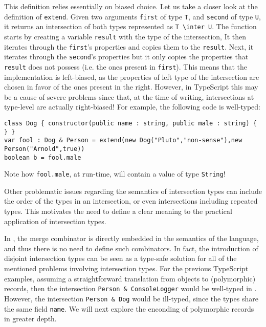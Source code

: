 This definition relies essentially on biased choice.
Let us take a closer look at the definition of \lstinline$extend$.
Given two arguments \lstinline$first$ of type \lstinline$T$, and \lstinline$second$ of type 
\lstinline $U$, it returns an intersection of both types represented as \lstinline$T \inter U$.
The function starts by creating a variable \lstinline$result$ with the type of the intersection, 
It then iterates through the \lstinline$first$'s properties and copies them to the 
\lstinline$result$.
Next, it iterates through the \lstinline$second$'s properties but it only copies the properties
that \lstinline$result$ does not possess (i.e. the ones present in \lstinline$first$).
This means that the implementation is left-biased, as the properties of left type of the intersection
are chosen in favor of the ones present in the right.
However, in TypeScript this may be a cause of severe problems since that, at the time of writing,
intersections at type-level are actually right-biased!
For example, the following code is well-typed:

\begin{lstlisting}
class Dog { constructor(public name : string, public male : string) { } }
var fool : Dog & Person = extend(new Dog("Pluto","non-sense"),new Person("Arnold",true))
boolean b = fool.male
\end{lstlisting}
Note how \lstinline$fool.male$, at run-time, will contain a value of type \lstinline$String$! 

Other problematic issues regarding the semantics of intersection types can include the order of 
the types in an intersection, or even intersections including repeated types.
This motivates the need to define a clear meaning to the practical application of 
intersection types.

In \name, the merge combinator is directly embedded in the semantics of the language, 
and thus there is no need to define such combinators.
In fact, the introduction of disjoint intersection types can be seen as a type-safe 
solution for all of the mentioned problems involving intersection types. 
For the previous TypeScript examples, assuming a straightforward translation from objects
to (polymorphic) records, then the intersection \lstinline$Person & ConsoleLogger$ would be 
well-typed in \name.
However, the intersection \lstinline$Person & Dog$ would be ill-typed, since the types share the
same field \lstinline$name$. 
We will next explore the enconding of polymorphic records in greater depth. 

